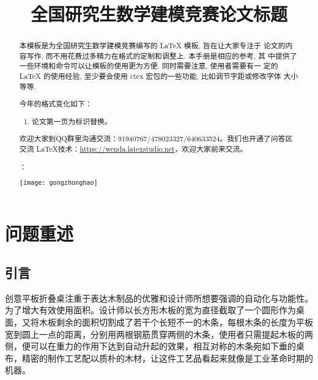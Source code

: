 \documentclass[bwprint]{gmcmthesis}
\title{全国研究生数学建模竞赛论文标题}
\begin{document}
 \maketitle

\begin{abstract}
本模板是为全国研究生数学建模竞赛编写的 \LaTeX{} 模板, 旨在让大家专注于
论文的内容写作, 而不用花费过多精力在格式的定制和调整上. 本手册是相应的参考, 其
中提供了一些环境和命令可以让模板的使用更为方便. 同时需要注意, 使用者需要有一
定的 \LaTeX{} 的使用经验, 至少要会使用 ctex 宏包的一些功能, 比如调节字距或修改字体
大小等等.


 \begin{mdframed} [%
	roundcorner=5pt,
	linecolor=gray!50,
	outerlinewidth=0.5pt,
	middlelinewidth=0.3pt, backgroundcolor=gray!2,
innertopmargin=\topskip, frametitle={2020年格式变化说明},
frametitlefont= \bfseries,frametitlerule=true,frametitlealignment =\raggedright\noindent,
frametitlerulewidth=.5pt, frametitlebackgroundcolor=gray!2,]
今年的格式变化如下：
\begin{enumerate}
\item 论文第一页为标识替换。

\end{enumerate}

\end{mdframed}



欢迎大家到QQ群里沟通交流：91940767/478023327/640633524。我们也开通了问答区交流 \LaTeX{}技术：\url{https://wenda.latexstudio.net}，欢迎大家前来交流。


：

\centerline{\texttt{[image: gongzhonghao]}}


\end{abstract}

\pagestyle{plain}


\section{问题重述}

\subsection{引言}

创意平板折叠桌注重于表达木制品的优雅和设计师所想要强调的自动化与功能性。为了增大有效使用面积。设计师以长方形木板的宽为直径截取了一个圆形作为桌面，又将木板剩余的面积切割成了若干个长短不一的木条，每根木条的长度为平板宽到圆上一点的距离，分别用两根钢筋贯穿两侧的木条，使用者只需提起木板的两侧，便可以在重力的作用下达到自动升起的效果，相互对称的木条宛如下垂的桌布，精密的制作工艺配以质朴的木材，让这件工艺品看起来就像是工业革命时期的机器。\textsuperscript{ \cite{mittelbach_latex_2004}}
\end{document}
